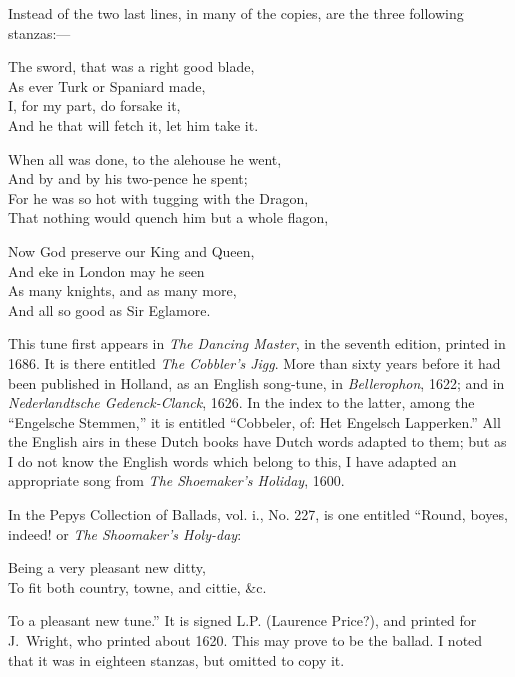 Instead of the two last lines, in many of the copies, are the three following
stanzas:—
\settowidth{\versewidth}{When all was done, to the alehouse he went,}
\begin{dcverse}The sword, that was a right good blade,\\
As ever Turk or Spaniard made,\\
I, for my part, do forsake it,\\
And he that will fetch it, let him take it.

When all was done, to the alehouse he went,\\
And by and by his two-pence he spent;\\
For he was so hot with tugging with the Dragon,\\
That nothing would quench him but a whole flagon,

Now God preserve our King and Queen,\\
And eke in London may he seen\\
As many knights, and as many more,\\
And all so good as Sir Eglamore.
\end{dcverse}


This tune first appears in \textit{The Dancing Master}, in the seventh edition, printed
in 1686. It is there entitled \textit{The Cobbler’s Jigg}. More than sixty years before
it had been published in Holland, as an English song-tune, in \textit{Bellerophon}, 1622;
and in \textit{Nederlandtsche Gedenck-Clanck}, 1626. In the index to the latter, among
the “Engelsche Stemmen,” it is entitled “Cobbeler, of: Het Engelsch Lapperken.” 
All the English airs in these Dutch books have Dutch words adapted to
them; but as I do not know the English words which belong to this, I have
adapted an appropriate song from \textit{The Shoemaker's Holiday}, 1600.

In the Pepys Collection of Ballads, vol. i., No. 227, is one entitled “Round,
boyes, indeed! or \textit{The Shoomaker's Holy-day}:
\settowidth{\versewidth}{To fit both country, towne, and cittie, \&c.}
\begin{scverse}Being a very pleasant new ditty,\\
To fit both country, towne, and cittie, \&c.
\end{scverse}
To a pleasant new tune.” It is signed L.P. (Laurence Price?), and printed
for J.~Wright, who printed about 1620. This may prove to be the ballad.
I noted that it was in eighteen stanzas, but omitted to copy it.

